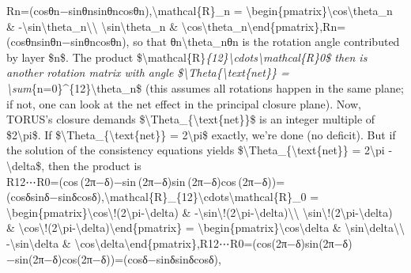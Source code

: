 \documentclass[
]{article}
\begin{document}
Rn=(cos⁡θn−sin⁡θnsin⁡θncos⁡θn),\textbackslash mathcal\{R\}\_n =
\textbackslash begin\{pmatrix\}\textbackslash cos\textbackslash theta\_n
\&
-\textbackslash sin\textbackslash theta\_n\textbackslash\textbackslash{}
\textbackslash sin\textbackslash theta\_n \&
\textbackslash cos\textbackslash theta\_n\textbackslash end\{pmatrix\},Rn\hspace{0pt}=(cosθn\hspace{0pt}sinθn\hspace{0pt}\hspace{0pt}−sinθn\hspace{0pt}cosθn\hspace{0pt}\hspace{0pt}),
so that θn\textbackslash theta\_nθn\hspace{0pt} is the rotation angle
contributed by layer \$n\$. The product
\$\textbackslash mathcal\{R\}\emph{\{12\}\textbackslash cdots\textbackslash mathcal\{R\}0\$
then is another rotation matrix with angle
\$\textbackslash Theta\{\textbackslash text\{net\}\} =
\textbackslash sum}\{n=0\}\^{}\{12\}\textbackslash theta\_n\$ (this
assumes all rotations happen in the same plane; if not, one can look at
the net effect in the principal closure plane). Now, TORUS's closure
demands \$\textbackslash Theta\_\{\textbackslash text\{net\}\}\$ is an
integer multiple of \$2\textbackslash pi\$. If
\$\textbackslash Theta\_\{\textbackslash text\{net\}\} =
2\textbackslash pi\$ exactly, we're done (no deficit). But if the
solution of the consistency equations yields
\$\textbackslash Theta\_\{\textbackslash text\{net\}\} =
2\textbackslash pi - \textbackslash delta\$, then the product is\\
R12⋯R0=(cos⁡ ⁣(2π−δ)−sin⁡ ⁣(2π−δ)sin⁡ ⁣(2π−δ)cos⁡ ⁣(2π−δ))=(cos⁡δsin⁡δ−sin⁡δcos⁡δ),\textbackslash mathcal\{R\}\_\{12\}\textbackslash cdots\textbackslash mathcal\{R\}\_0
=
\textbackslash begin\{pmatrix\}\textbackslash cos\textbackslash!(2\textbackslash pi-\textbackslash delta)
\&
-\textbackslash sin\textbackslash!(2\textbackslash pi-\textbackslash delta)\textbackslash\textbackslash{}
\textbackslash sin\textbackslash!(2\textbackslash pi-\textbackslash delta)
\&
\textbackslash cos\textbackslash!(2\textbackslash pi-\textbackslash delta)\textbackslash end\{pmatrix\}
= \textbackslash begin\{pmatrix\}\textbackslash cos\textbackslash delta
\& \textbackslash sin\textbackslash delta\textbackslash\textbackslash{}
-\textbackslash sin\textbackslash delta \&
\textbackslash cos\textbackslash delta\textbackslash end\{pmatrix\},R12\hspace{0pt}⋯R0\hspace{0pt}=(cos(2π−δ)sin(2π−δ)\hspace{0pt}−sin(2π−δ)cos(2π−δ)\hspace{0pt})=(cosδ−sinδ\hspace{0pt}sinδcosδ\hspace{0pt}),
\end{document}
